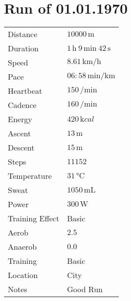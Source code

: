 \documentclass[20pt, a5paper]{article}
\begin{document}
\section*{Run of 01.01.1970}

\begin{center}
\begin{tabularx}{0.5\linewidth}{l l}
Distance & $10000 \,\unit{\meter}$\\
Duration & $1 \,\unit{\hour}~ 9 \,\unit{\minute}~ 42 \,\unit{\second}$\\
Speed & $8.61 \,\unit{\kilo\meter\per\hour}$\\
Pace & $06:58 \,\unit{\minute\per\kilo\meter}$\\
Heartbeat & $150 \,\unit{\per\minute}$\\
Cadence & $160 \,\unit{\per\minute}$\\
Energy & $420 \,\unit{\kilo cal}$\\
Ascent & $13 \,\unit{\meter}$\\
Descent & $15 \,\unit{\meter}$\\
Steps & $11152$\\
Temperature & $31 \,\unit{\degreeCelsius}$\\
Sweat & $1050 \,\unit{\milli\liter}$\\
Power & $300 \,\unit{\watt}$\\
Training Effect & Basic\\
Aerob & $2.5$\\
Anaerob & $0.0$\\
Training & Basic\\
Location & City\\
Notes & Good Run
\end{tabularx}
\end{center}
\end{document}

